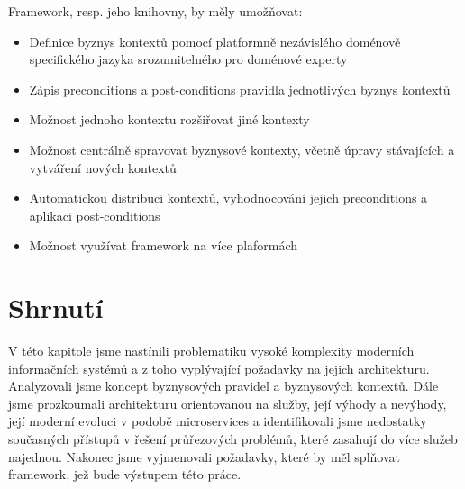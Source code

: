 Framework, resp. jeho knihovny, by měly umožňovat:

\begin{itemize}
    \item{Definice byznys kontextů pomocí platformně nezávislého doménově specifického jazyka srozumitelného pro doménové experty}
    \item{Zápis preconditions a post-conditions pravidla jednotlivých byznys kontextů}
    \item{Možnost jednoho kontextu rozšiřovat jiné kontexty}
    \item{Možnost centrálně spravovat byznysové kontexty, včetně úpravy stávajících a vytváření nových kontextů}
    \item{Automatickou distribuci kontextů, vyhodnocování jejich preconditions a aplikaci post-conditions}
    \item{Možnost využívat framework na více plaformách}
\end{itemize}

\section{Shrnutí}

V této kapitole jsme nastínili problematiku vysoké komplexity moderních informačních systémů
a z toho vyplývající požadavky na jejich architekturu. Analyzovali jsme koncept byznysových
pravidel a byznysových kontextů. Dále jsme prozkoumali architekturu orientovanou na služby, její
výhody a nevýhody, její moderní evoluci v podobě microservices a identifikovali jsme nedostatky
současných přístupů v řešení průřezových problémů, které zasahují do více služeb najednou. Nakonec
jsme vyjmenovali požadavky, které by měl splňovat framework, jež bude výstupem této práce.
